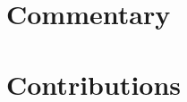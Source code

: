 \documentclass[12pt,twoside,openright,a4paper]{report}
\let\openright=\cleardoublepage
\begin{document}

\tableofcontents



\pagestyle{plain}
\setcounter{page}{1}
\part{Commentary}\label{part:comments}




\part{Contributions}\label{part:contribs}



\openright
\end{document}
